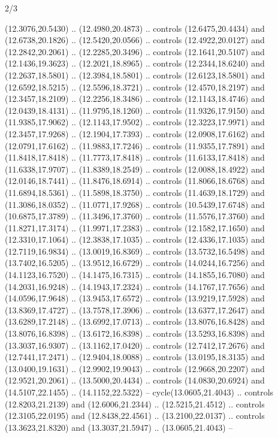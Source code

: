 \begin{flagdescription}{2/3}
\begin{scope}[yshift=\flagwidth,scale=\flagwidth/1241.93737]
\begin{scope}[y=-1mm, x=1mm,draw=gold,fill=blue,line join=miter,miter limit=4,line width=1.8\lw]
{  (12.3076,20.5430) .. (12.4980,20.4873) .. controls (12.6475,20.4434) and
  (12.6738,20.1826) .. (12.5420,20.0566) .. controls (12.4922,20.0127) and
  (12.2842,20.2061) .. (12.2285,20.3496) .. controls (12.1641,20.5107) and
  (12.1436,19.3623) .. (12.2021,18.8965) .. controls (12.2344,18.6240) and
  (12.2637,18.5801) .. (12.3984,18.5801) .. controls (12.6123,18.5801) and
  (12.6592,18.5215) .. (12.5596,18.3721) .. controls (12.4570,18.2197) and
  (12.3457,18.2109) .. (12.2256,18.3486) .. controls (12.1143,18.4746) and
  (12.0439,18.4131) .. (11.9795,18.1260) .. controls (11.9326,17.9150) and
  (11.9385,17.9062) .. (12.1143,17.9502) .. controls (12.3223,17.9971) and
  (12.3457,17.9268) .. (12.1904,17.7393) .. controls (12.0908,17.6162) and
  (12.0791,17.6162) .. (11.9883,17.7246) .. controls (11.9355,17.7891) and
  (11.8418,17.8418) .. (11.7773,17.8418) .. controls (11.6133,17.8418) and
  (11.6338,17.9707) .. (11.8389,18.2549) .. controls (12.0088,18.4922) and
  (12.0146,18.7441) .. (11.8476,18.6914) .. controls (11.8066,18.6768) and
  (11.6894,18.5361) .. (11.5898,18.3750) .. controls (11.4639,18.1729) and
  (11.3086,18.0352) .. (11.0771,17.9268) .. controls (10.5439,17.6748) and
  (10.6875,17.3789) .. (11.3496,17.3760) .. controls (11.5576,17.3760) and
  (11.8271,17.3174) .. (11.9971,17.2383) .. controls (12.1582,17.1650) and
  (12.3310,17.1064) .. (12.3838,17.1035) .. controls (12.4336,17.1035) and
  (12.7119,16.9834) .. (13.0019,16.8369) .. controls (13.5732,16.5498) and
  (13.7402,16.5205) .. (13.9512,16.6729) .. controls (14.0244,16.7256) and
  (14.1123,16.7520) .. (14.1475,16.7315) .. controls (14.1855,16.7080) and
  (14.2031,16.9248) .. (14.1943,17.2324) .. controls (14.1767,17.7656) and
  (14.0596,17.9648) .. (13.9453,17.6572) .. controls (13.9219,17.5928) and
  (13.8369,17.4727) .. (13.7578,17.3906) .. controls (13.6377,17.2647) and
  (13.6289,17.2148) .. (13.6992,17.0713) .. controls (13.8076,16.8428) and
  (13.8076,16.8398) .. (13.6172,16.8398) .. controls (13.5293,16.8398) and
  (13.3037,16.9307) .. (13.1162,17.0420) .. controls (12.7412,17.2676) and
  (12.7441,17.2471) .. (12.9404,18.0088) .. controls (13.0195,18.3135) and
  (13.0400,19.1631) .. (12.9902,19.9043) .. controls (12.9668,20.2207) and
  (12.9521,20.2061) .. (13.5000,20.4434) .. controls (14.0830,20.6924) and
  (14.5107,22.1455) .. (14.1152,22.5322) -- cycle(13.0605,21.4043) .. controls
  (12.8203,21.2139) and (12.6006,21.2344) .. (12.5215,21.4512) .. controls
  (12.3105,22.0195) and (12.8438,22.4561) .. (13.2100,22.0137) .. controls
  (13.3623,21.8320) and (13.3037,21.5947) .. (13.0605,21.4043) --
}
\end{scope}
\end{scope}
\end{flagdescription}
